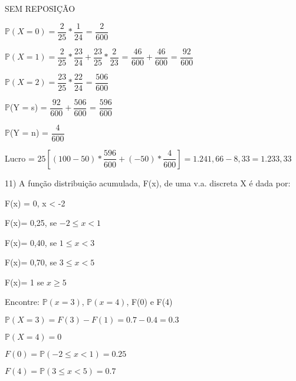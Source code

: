 \documentclass[12pt,a4paper]{article}
\begin{document}
\vspace{1.5cm}
SEM REPOSIÇÃO

\begin{center}	
	\vspace{0.5cm}
	$\mathbb{P}(X=0) = \dfrac{2}{25}*\dfrac{1}{24}$ = $\dfrac{2}{600}$
	
	\vspace{0.5cm}
	$\mathbb{P}(X=1) = \dfrac{2}{25}*\dfrac{23}{24} + \dfrac{23}{25}*\dfrac{2}{23}$ = $\dfrac{46}{600} + \dfrac{46}{600}$ = $\dfrac{92}{600}$
	
	\vspace{0.5cm}
	$\mathbb{P}(X=2) = \dfrac{23}{25}*\dfrac{22}{24}$ = $\dfrac{506}{600}$
	
	\vspace{1cm}
	$\mathbb{P}$(Y = s) = $\dfrac{92}{600} + \dfrac{506}{600}$ = $\dfrac{596}{600}$
	
	\vspace{0.5cm}
	$\mathbb{P}$(Y = n) = $\dfrac{4}{600}$
	
	\vspace{1cm}
	Lucro = $ 25\left[(100 - 50) * \dfrac{596}{600} + (-50) * \dfrac{4}{600}\right] = 1.241,66 - 8,33 = 1.233,33$
\end{center}

\vspace{1cm}
11) A função distribuição acumulada, F(x), de uma v.a. discreta X é dada por:

F(x) = 0, x < -2

F(x)= 0,25, se $-2\leq{x}< 1$

F(x)= 0,40, se  $1\leq{x}< 3$

F(x)= 0,70, se $3\leq{x}< 5$

F(x)= 1 se $x\geq{5}$

Encontre: $\mathbb{P}(x=3)$, $\mathbb{P}(x=4)$, F(0) e F(4) 

\begin{center}
	\vspace{0.25cm}
	$\mathbb{P}(X = 3) = F(3) - F(1) = 0.7 - 0.4 = 0.3$
	
	\vspace{0.5cm}
	$\mathbb{P}(X = 4) = 0$
	
	\vspace{0.5cm}
	$F(0) = \mathbb{P}(-2\leq{x}< 1) = 0.25$
	
	\vspace{0.5cm}
	$F(4) = \mathbb{P}(3\leq{x}< 5) = 0.7$
\end{center}
\end{document}
